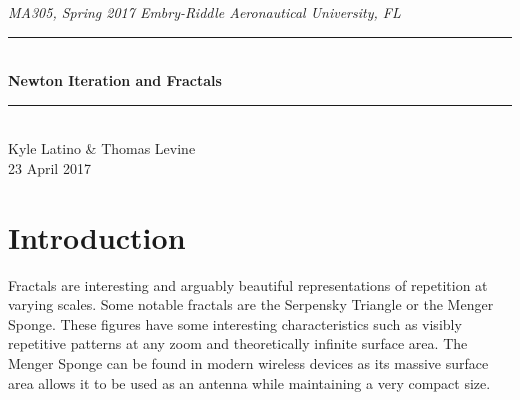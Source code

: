 \documentclass[11pt]{article}
\newcommand{\horrule}[1]{\rule{\linewidth}{#1}} 	%
\begin{document}
\begin{center}
{\it MA305, Spring 2017 \hfill Embry-Riddle Aeronautical University, FL 
 }
		\horrule{0.5pt} \\[0.4cm]
		{\bf \Large  Newton Iteration and Fractals}\\
		\horrule{2pt} \\[2cm]
Kyle Latino \& Thomas Levine
\\[0.4cm]
23 April 2017 %
\end{center}

\begin{center}
\end{center}

\thispagestyle{empty}
\newpage
\begin{abstract}

\end{abstract}
\tableofcontents 
\newpage

\section{Introduction}\label{S:1}
Fractals are interesting and arguably beautiful representations of repetition at varying scales. Some notable fractals are the Serpensky Triangle or the Menger Sponge. These figures have some interesting characteristics such as visibly repetitive patterns at any zoom and theoretically infinite surface area. The Menger Sponge can be found in modern wireless devices as its massive surface area allows it to be used as an antenna while maintaining a very compact size.
\end{document}
